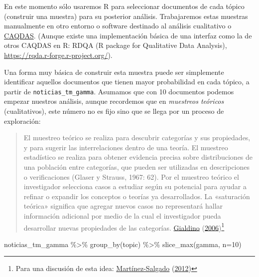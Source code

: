 \documentclass[
]{book}
\newenvironment{Shaded}{\begin{snugshade}}{\end{snugshade}}
\newcommand{\AttributeTok}[1]{\textcolor[rgb]{0.77,0.63,0.00}{#1}}
\newcommand{\DecValTok}[1]{\textcolor[rgb]{0.00,0.00,0.81}{#1}}
\newcommand{\FunctionTok}[1]{\textcolor[rgb]{0.00,0.00,0.00}{#1}}
\newcommand{\NormalTok}[1]{#1}
\newcommand{\SpecialCharTok}[1]{\textcolor[rgb]{0.00,0.00,0.00}{#1}}
\begin{document}
En este momento sólo usaremos R para seleccionar documentos de cada tópico (construir una muestra) para su posterior análisis.
Trabajaremos estas muestras manualmente en otro entorno o software destinado al análisis cualitativo o \href{https://es.wikipedia.org/wiki/Programa_para_el_an\%C3\%A1lisis_cualitativo_asistido_por_computador}{CAQDAS}.
(Aunque existe una implementación básica de una interfaz como la de otros CAQDAS en R: RDQA (R package for Qualitative Data Analysis), \url{https://rqda.r-forge.r-project.org/}).

Una forma muy básica de construir esta muestra puede ser simplemente identificar aquellos documentos que tienen mayor probabilidad en cada tópico, a partir de \texttt{noticias\_tm\_gamma}. Asumamos que con 10 documentos podemos empezar nuestros análisis, aunque recordemos que en \emph{muestreos teóricos} (cualitativos), este número no es fijo sino que se llega por un proceso de exploración:

\begin{quote}
El muestreo teórico se realiza para descubrir categorías y sus propiedades, y para sugerir las interrelaciones dentro de una teoría. El muestreo estadístico se realiza para obtener evidencia precisa sobre distribuciones de una población entre categorías, que pueden ser utilizadas en descripciones o verificaciones (Glaser y Strauss, 1967: 62). Por el muestreo teórico el investigador selecciona casos a estudiar según su potencial para ayudar a refinar o expandir los conceptos o teorías ya desarrollados. La «saturación teórica» significa que agregar nuevos casos no representará hallar información adicional por medio de la cual el investigador pueda desarrollar nuevas propiedades de las categorías. \protect\hyperlink{ref-Gialdino2006}{Gialdino} (\protect\hyperlink{ref-Gialdino2006}{2006})\footnote{Para una discusión de esta idea: \protect\hyperlink{ref-Martinez-Salgado2012}{Martínez-Salgado} (\protect\hyperlink{ref-Martinez-Salgado2012}{2012})}
\end{quote}

\begin{Shaded}
\begin{Highlighting}[]
\NormalTok{noticias\_tm\_gamma }\SpecialCharTok{\%\textgreater{}\%} 
  \FunctionTok{group\_by}\NormalTok{(topic) }\SpecialCharTok{\%\textgreater{}\%}
  \FunctionTok{slice\_max}\NormalTok{(gamma, }\AttributeTok{n=}\DecValTok{10}\NormalTok{)}
\end{Highlighting}
\end{Shaded}
\end{document}
